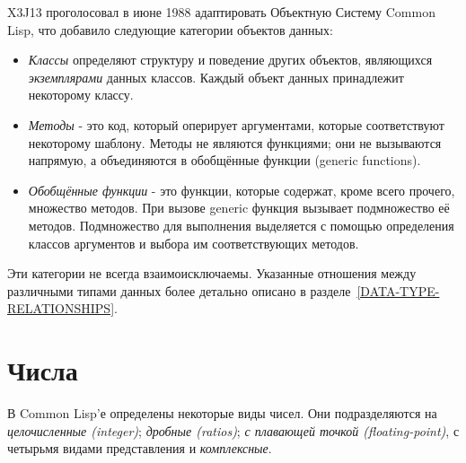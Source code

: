 \begin{new}
X3J13 проголосовал в июне 1988 адаптировать Объектную Систему Common Lisp, 
что добавило следующие категории объектов данных: 

\begin{itemize}
\item
\emph{Классы} определяют структуру и поведение других объектов,
являющихся \emph{экземплярами} данных классов. Каждый объект данных
принадлежит некоторому классу. 

\item
\emph{Методы} - это код, который оперирует аргументами, которые
соответствуют некоторому шаблону. Методы не являются функциями; они
не вызываются напрямую, а объединяются в обобщённые функции (generic
functions). 

\item
\emph{Обобщённые функции} - это функции, которые содержат, кроме всего
прочего, множество методов. При вызове generic функция вызывает
подмножество её методов. Подмножество для выполнения выделяется с
помощью определения классов аргументов и выбора им соответствующих
методов. 
\end{itemize}
\end{new}

Эти категории не всегда взаимоисключаемы. Указанные отношения
между различными типами данных более детально описано в
разделе~\ref{DATA-TYPE-RELATIONSHIPS}. 

\section{Числа}

В Common Lisp'е определены некоторые виды чисел. Они
подразделяются на \emph{целочисленные (integer)}; \emph{дробные
(ratios)}; \emph{с плавающей точкой (floating-point)}, с
четырьмя видами представления и \emph{комплексные}.

